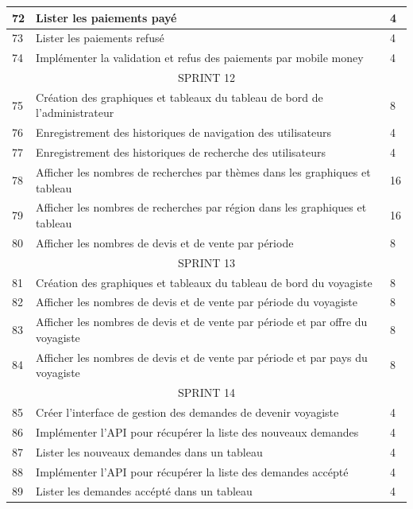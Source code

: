 \documentclass[12pt]{report}
\begin{document}
\begin{longtable}{|p{1cm}|p{7cm}|p{6cm}|}
						\hline
						72 & Lister les paiements payé & 4\\
						\hline
						73 & Lister les paiements refusé & 4\\
						\hline
						74 & Implémenter la validation et refus des paiements par mobile money & 4\\
						\hline
						\multicolumn{3}{|c|}{SPRINT 12}\\
						\hline						
						75 & Création des graphiques et tableaux du tableau de bord de l'administrateur& 8\\
						\hline
						76 & Enregistrement des historiques de navigation des utilisateurs &4\\
						\hline
						77 & Enregistrement des historiques de recherche des utilisateurs & 4\\
						\hline
						78 & Afficher les nombres de recherches par thèmes dans les graphiques et tableau & 16\\
						\hline
						79 & Afficher les nombres de recherches par région dans les graphiques et tableau & 16\\
						\hline
						80 & Afficher les nombres de devis et de vente par période & 8\\
						\hline
						\multicolumn{3}{|c|}{SPRINT 13}\\
						\hline												  
						81 & Création des graphiques et tableaux du tableau de bord du voyagiste& 8\\
						\hline
						82 & Afficher les nombres de devis et de vente par période du voyagiste & 8\\
						\hline
						83 & Afficher les nombres de devis et de vente par période et par offre du voyagiste & 8\\
						\hline
						84 & Afficher les nombres de devis et de vente par période et par pays du voyagiste & 8\\
						\hline
						\multicolumn{3}{|c|}{SPRINT 14}\\
						\hline							
						85 & Créer l'interface de gestion des demandes de devenir voyagiste & 4\\
						\hline
						86 & Implémenter l'API pour récupérer la liste des nouveaux demandes & 4\\
						\hline
						87 & Lister les nouveaux demandes dans un tableau & 4\\
						\hline
						88 & Implémenter l'API pour récupérer la liste des demandes accépté & 4\\
						\hline
						89 & Lister les demandes accépté dans un tableau & 4\\

\end{longtable}
\end{document}
